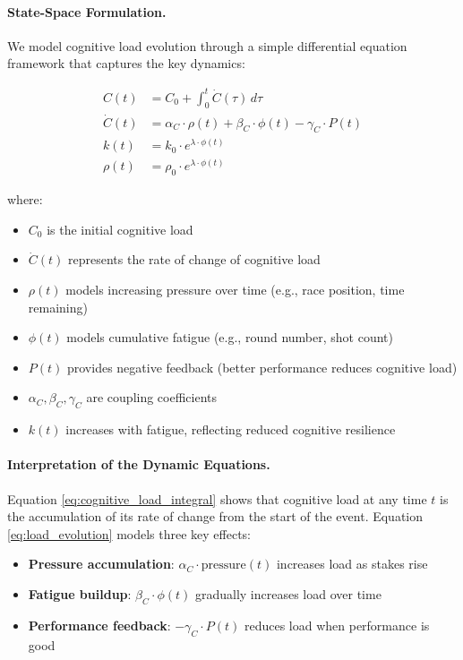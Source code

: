 \documentclass{article}
\begin{document}
\paragraph{State-Space Formulation.} We model cognitive load evolution through a simple differential equation 
framework that captures the key dynamics:

\begin{align}
C(t) &= C_0 + \int_0^t \dot{C}(\tau) \, d\tau \label{eq:cognitive_load_integral} \\
\dot{C}(t) &= \alpha_C \cdot \rho(t) + \beta_C \cdot \phi(t) - \gamma_C \cdot P(t) \label{eq:load_evolution} \\
k(t) &= k_0 \cdot e^{\lambda \cdot \phi(t)} \label{eq:decay_evolution} \\
\rho(t) &= \rho_0 \cdot e^{\lambda \cdot \phi(t)} \label{eq:pressure_evolution}
\end{align}

where:
\begin{itemize}
    \item $C_0$ is the initial cognitive load
    \item $\dot{C}(t)$ represents the rate of change of cognitive load
    \item $\rho(t)$ models increasing pressure over time (e.g., race position, time remaining)
    \item $\phi(t)$ models cumulative fatigue (e.g., round number, shot count)
    \item $P(t)$ provides negative feedback (better performance reduces cognitive load)
    \item $\alpha_C, \beta_C, \gamma_C$ are coupling coefficients
    \item $k(t)$ increases with fatigue, reflecting reduced cognitive resilience
\end{itemize}

\paragraph{Interpretation of the Dynamic Equations.} Equation \eqref{eq:cognitive_load_integral} shows that 
cognitive load at any time $t$ is the accumulation of its rate of change from the start of the event. Equation 
\eqref{eq:load_evolution} models three key effects:

\begin{itemize}
    \item \textbf{Pressure accumulation}: $\alpha_C \cdot \text{pressure}(t)$ increases load as stakes rise
    \item \textbf{Fatigue buildup}: $\beta_C \cdot \phi(t)$ gradually increases load over time
    \item \textbf{Performance feedback}: $-\gamma_C \cdot P(t)$ reduces load when performance is good
\end{itemize}
\end{document}
